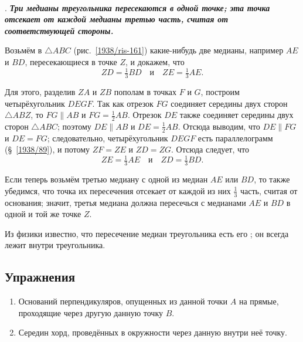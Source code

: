 \paragraph{}\label{1938/143} 
\mbox{.}
\textbf{\emph{Три медианы треугольника пересекаются в одной точке;
эта точка отсекает от каждой медианы третью часть, считая от соответствующей стороны.}}

Возьмём в $\triangle ABC$ (рис.~\ref{1938/ris-161}) какие-нибудь две медианы, например $AE$ и $BD$, пересекающиеся в точке $Z$, и докажем, что
\[ZD=\tfrac13 BD\quad\text{и}\quad ZE = \tfrac13 AE.\]

Для этого, разделив $ZA$ и $ZB$ пополам в точках $F$ и $G$, построим четырёхугольник $DEGF$.
Так как отрезок $FG$ соединяет середины двух сторон $\triangle ABZ$, то $FG\parallel AB$ и $FG=\tfrac12 AB$.
Отрезок $DE$ также соединяет середины двух сторон $\triangle ABC$;
поэтому $DE\parallel AB$ и $DE=\tfrac12 AB$.
Отсюда выводим, что $DE \parallel FG$ и $DE=FG$;
следовательно, четырёхугольник $DEGF$ есть параллелограмм (§~\ref{1938/89}), и потому $ZF=ZE$ и $ZD=ZG$.
Отсюда следует, что
\[ ZE=\tfrac13AE\quad\text{и}\quad ZD=\tfrac13 BD.\]

Если теперь возьмём третью медиану с одной из медиан $AE$ или $BD$, то также убедимся, что точка их пересечения отсекает от каждой из них $\tfrac13$ часть, считая от основания;
значит, третья медиана должна пересечься с медианами $AE$ и $BD$ в одной и той же точке $Z$.

Из физики известно, что пересечение медиан треугольника есть его ;
он всегда лежит внутри треугольника.


\subsection*{Упражнения}

\begin{center}
\end{center}

\begin{enumerate}


\item
Оснований перпендикуляров, опущенных из данной точки $A$ на прямые, проходящие через другую данную точку $B$.

\item
Середин хорд, проведённых в окружности через данную внутри неё точку.

\end{enumerate}

